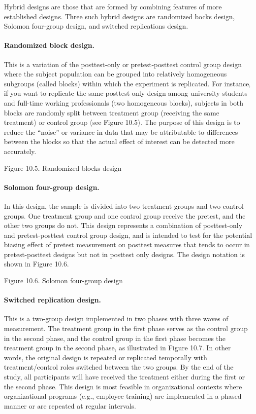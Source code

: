 Hybrid designs are those that are formed by combining features of more established designs. Three such hybrid designs are randomized bocks design, Solomon four-group design, and switched replications design.

\paragraph{Randomized block design.} This is a variation of the posttest-only or pretest-posttest control group design where the subject population can be grouped into relatively homogeneous subgroups (called blocks) within which the experiment is replicated. For instance, if you want to replicate the same posttest-only design among university students and full-time working professionals (two homogeneous blocks), subjects in both blocks are randomly split between treatment group (receiving the same treatment) or control group (see Figure 10.5). The purpose of this design is to reduce the “noise” or variance in data that may be attributable to differences between the blocks so that the actual effect of interest can be detected more accurately.

Figure 10.5. Randomized blocks design

\paragraph{Solomon four-group design.} In this design, the sample is divided into two treatment groups and two control groups. One treatment group and one control group receive the pretest, and the other two groups do not. This design represents a combination of posttest-only and pretest-posttest control group design, and is intended to test for the potential biasing effect of pretest measurement on posttest measures that tends to occur in pretest-posttest designs but not in posttest only designs. The design notation is shown in Figure 10.6.

Figure 10.6. Solomon four-group design

\paragraph{Switched replication design.} This is a two-group design implemented in two phases with three waves of measurement. The treatment group in the first phase serves as the control group in the second phase, and the control group in the first phase becomes the treatment group in the second phase, as illustrated in Figure 10.7. In other words, the original design is repeated or replicated temporally with treatment/control roles switched between the two groups. By the end of the study, all participants will have received the treatment either during the first or the second phase. This design is most feasible in organizational contexts where organizational programs (e.g., employee training) are implemented in a phased manner or are repeated at regular intervals.

